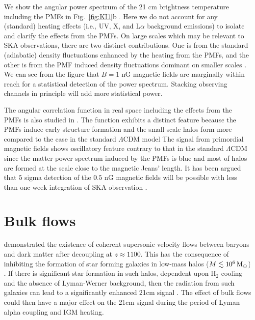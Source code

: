 \documentclass{PoS}
\begin{document}
We show the angular power spectrum of the 21 cm brightness temperature
including the PMFs in Fig.~\ref{fig:KI1}b
\citep{2014arXiv1403.2608S}. Here we do not account for any (standard)
heating effects (i.e., UV, X, and L$\alpha$ background emissions) to isolate and
clarify the effects from the PMFs.  On large scales which may be
relevant to SKA 
observations, there are two distinct contributions. One is from the
standard (adiabatic) density fluctuations enhanced by the heating from
the PMFs, and the other is from the PMF induced density fluctuations
dominant on smaller scales
\citep{2006MNRAS.372.1060T,2009ApJ...692..236S}. We can see from the
figure that $B=1$ nG
magnetic fields are marginally within reach for a statistical detection
of the power spectrum. Stacking observing channels in principle will add
more statistical power.

The angular correlation function in real space including the effects
from the PMFs is also studied in \cite{2009JCAP...11..021S}.  The
function exhibits a distinct feature because the PMFs induce early
structure formation and the small scale halos form more compared to the
case in the standard $\Lambda$CDM model The signal from primordial
magnetic fields shows oscillatory feature contrary to that in the
standard $\Lambda$CDM since the matter power spectrum induced by the
PMFs is blue and most of halos are formed at the scale close to the
magnetic Jeans' length. It has been argued that $5$ sigma detection of
the $0.5$ nG magnetic fields will be possible with less than one week
integration of SKA observation \citep{2009JCAP...11..021S}.

\section{Bulk flows}

\cite{2010PhRvD..82h3520T} demonstrated the existence of coherent supersonic velocity flows between baryons and dark matter after decoupling at $z\approx1100$. This has the consequence of inhibiting the formation of star forming galaxies in low-mass halos ($M\lesssim10^6{\rm\,M_\odot}$) \citep[e.g.][]{2011MNRAS.412L..40M,2011ApJ...730L...1S}. If there is significant star formation in such halos, dependent upon H$_2$ cooling and the absence of Lyman-Werner background, then the radiation from such galaxies can lead to a significantly enhanced 21cm signal \citep{2012Natur.487...70V,2014MNRAS.437L..36F,2012ApJ...760....3M}. The effect of bulk flows could then have a major effect on the 21cm signal during the period of Lyman alpha coupling and IGM heating.
\end{document}
